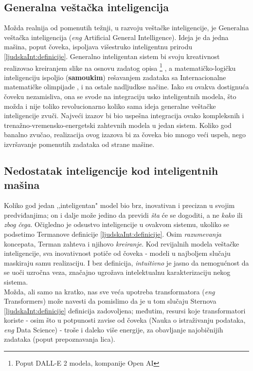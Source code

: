 \documentclass[a4paper]{article}
\begin{document}
\subsection{Generalna veštačka inteligencija}
Možda realnija od pomenutih težnji, u razvoju veštačke inteligencije, je Generalna veštačka inteligencija (\emph{eng} Artificial General Intelligence). Ideja je da jedna mašina, poput čoveka, ispoljava višestruko inteligentnu prirodu \ref{ljudskaInt:definicije}. Generalno inteligentan sistem bi svoju kreativnost realizovao kreiranjem slike na osnovu zadatog opisa \footnote{Poput DALL-E 2 modela, kompanije Open AI} \cite{dalle2}, a matematičko-logičku inteligenciju ispoljio (\textbf{samoukim}) rešavanjem zadataka sa Internacionalne matematičke olimpijade \cite{formalmath}, i na ostale nadljudkse načine. Iako su ovakva dostignuća čoveku nezamisliva, ona se svode na integraciju usko inteligentnih modela, što možda i nije toliko revolucionarno koliko sama ideja generalne veštačke inteligencije zvuči. Najveći izazov bi bio uspešna integracija ovako kompleksnih i trenažno-vremensko-energetski zahtevnih modela u jedan sistem. Koliko god banalno zvučao, realizacija ovog izazova bi za čoveka bio mnogo veći uspeh, nego izvršavanje pomenutih zadataka od strane mašine.

\subsection*{Nedostatak inteligencije kod inteligentnih mašina}
Koliko god jedan ,,inteligentan" model bio brz, inovativan i precizan u svojim predviđanjima; on i dalje može jedino da previdi \emph{šta} će se dogoditi, a ne \emph{kako} ili \emph{zbog čega}. Očigledno je odsustvo inteligencije u ovakvom sistemu, ukoliko se podsetimo Termanove definicije \ref{ljudskaInt:definicije}. Osim \emph{razumevanja} koncepata, Terman zahteva i njihovo \emph{kreiranje}. Kod revijalnih modela veštačke inteligencije, sva inovativnost potiče od čoveka - modeli u najboljem slučaju maskiraju samu realizaciju. I bez definicija, \emph{intuitivno} je jasno da nemogućnost da se uoči uzročna veza, značajno ugrožava intelektualnu karakterizaciju nekog sistema. \\
Možda, ali samo na kratko, nas sve veća upotreba transformatora (\emph{eng} Transformers) može navesti da pomislimo da je u tom slučaju Sternova \ref{ljudskaInt:definicije} definicija zadovoljena; međutim, resursi koje transformatori koriste - osim što u potpunosti zavise od čoveka (Nauka o istraživanju podataka, \emph{eng} Data Science) - troše i daleko više energije, za obavljanje najobičnijih zadataka\cite{frontiers} (poput prepoznavanja lica).\\
\end{document}
